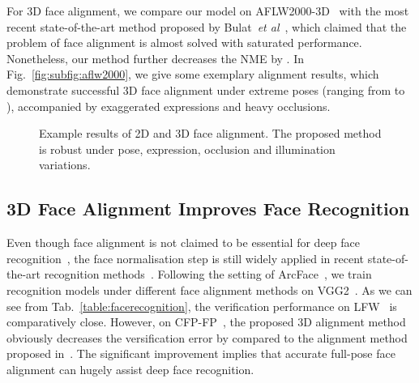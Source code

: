 \documentclass{bmvc2k}
\def\etal{\emph{et al}\bmvaOneDot}
\begin{document}
For 3D face alignment, we compare our model on AFLW2000-3D~\cite{zhu2016face} with the most recent state-of-the-art method proposed by Bulat~\etal~\cite{bulat2017binarized}, which claimed that the problem of face alignment is almost solved with saturated performance. Nonetheless, our method further decreases the NME by . In Fig.~\ref{fig:subfig:aflw2000}, we give some exemplary alignment results, which demonstrate successful 3D face alignment under extreme poses (ranging from  to ), accompanied by exaggerated expressions and heavy occlusions. 

\begin{figure*}[h!]
\centering
\vspace{-2mm}
\vspace{-2mm}
\vspace{-2mm}
\vspace{-2mm}
\vspace{-2mm}
\vspace{-2mm}
\caption{Example results of 2D and 3D face alignment. The proposed method is robust under pose, expression, occlusion and illumination variations.}
\vspace{-2mm}
\label{fig:examples}
\end{figure*}

\subsection{3D Face Alignment Improves Face Recognition}

Even though face alignment is not claimed to be essential for deep face recognition~\cite{schroff2015facenet,deng2017marginal,deng2017uv,deng2018arcface}, the face normalisation step is still widely applied in recent state-of-the-art recognition methods~\cite{deng2018arcface}. Following the setting of ArcFace~\cite{deng2018arcface}, we train recognition models under different face alignment methods on VGG2~\cite{cao2017vggface2}. As we can see from Tab.~\ref{table:facerecognition}, the verification performance on LFW~\cite{huang2007labeled} is comparatively close. However, on CFP-FP~\cite{sengupta2016frontal}, the proposed 3D alignment method obviously decreases the versification error by  compared to the alignment method proposed in~\cite{zhang2016joint}. The significant improvement implies that accurate full-pose face alignment can hugely assist deep face recognition.
\end{document}
